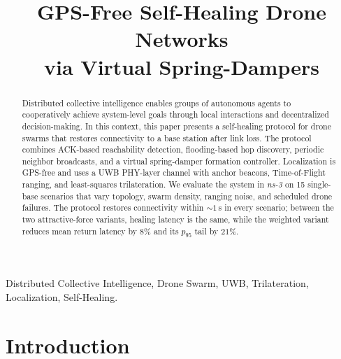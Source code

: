 \documentclass[conference]{IEEEtran}
\begin{document}
\title{GPS-Free Self-Healing Drone Networks\\via Virtual Spring-Dampers}

\author{
}

\newcommand{\fc}[1]{{\color{red}{FC: #1}}}


\maketitle

\begin{abstract}
Distributed collective intelligence enables groups of autonomous agents to 
cooperatively achieve system-level goals through local interactions and 
decentralized decision-making. In this context, this paper presents a 
self-healing protocol for drone swarms that restores connectivity to a base 
station after link loss. The protocol combines ACK-based reachability detection, 
flooding-based hop discovery, periodic neighbor broadcasts, and a virtual 
spring-damper formation controller. Localization is GPS-free and uses a 
UWB PHY-layer channel with anchor beacons, Time-of-Flight ranging, and 
least-squares trilateration. We evaluate the system in \textit{ns-3} on 15 
single-base scenarios that vary topology, swarm density, ranging noise, and 
scheduled drone failures. The protocol restores connectivity within $\sim1$\,s 
in every scenario; between the two attractive-force variants, healing latency 
is the same, while the weighted variant reduces mean return latency by $8\%$ 
and its $p_{95}$ tail by $21\%$.
\end{abstract}

\begin{IEEEkeywords}
Distributed Collective Intelligence, Drone Swarm, UWB, Trilateration, Localization, Self-Healing.
\end{IEEEkeywords}

\section{Introduction}
\end{document}
